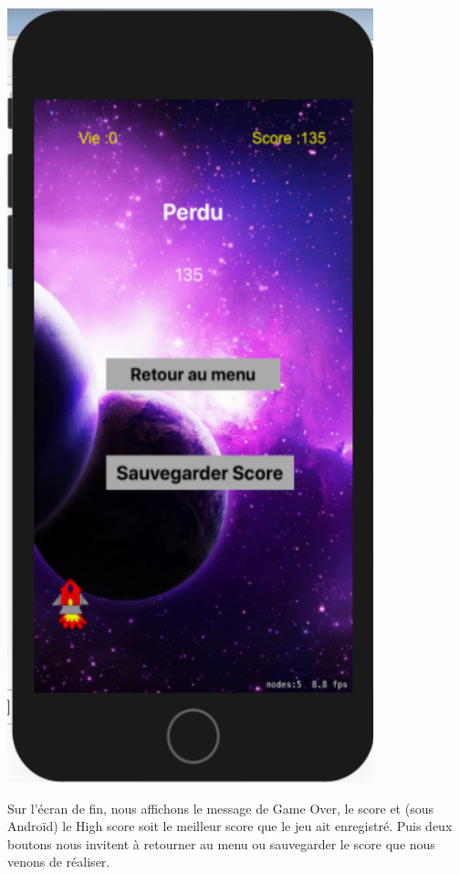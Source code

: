 \documentclass{article}
\begin{document}
   \begin{minipage}[c]{.46\linewidth}
    \begin{center}
            \includegraphics[scale=0.38]{GameOVerIOS.png}
        \end{center}
 \end{minipage}

Sur l'écran de fin, nous affichons le message de Game Over, le score et (sous Androïd) le High score soit le meilleur score que le jeu ait enregistré. 
Puis deux boutons nous invitent à retourner au menu ou sauvegarder le score que nous venons de réaliser.
\end{document}
